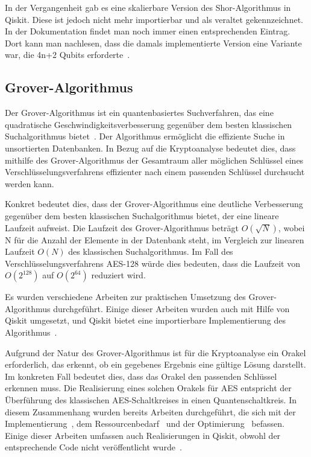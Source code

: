 \documentclass[
  a4paper, %
  10pt, %
  unnumberedsections, %
  twoside, %
]{LTJournalArticle}
\begin{document}
In der Vergangenheit gab es eine skalierbare Version des Shor-Algorithmus in Qiskit.
Diese ist jedoch nicht mehr importierbar und als veraltet gekennzeichnet.
In der Dokumentation findet man noch immer einen entsprechenden Eintrag.
Dort kann man nachlesen, dass die damals implementierte Version eine Variante war,
die 4n+2 Qubits erforderte~\autocite{IBM:Shor_docu}.

\subsection{Grover-Algorithmus}
Der Grover-Algorithmus ist ein quantenbasiertes Suchverfahren,
das eine quadratische Geschwindigkeitsverbesserung
gegenüber dem besten klassischen Suchalgorithmus bietet~\autocite{grover1996fast}.
Der Algorithmus ermöglicht die effiziente Suche in unsortierten Datenbanken.
In Bezug auf die Kryptoanalyse bedeutet dies,
dass mithilfe des Grover-Algorithmus der Gesamtraum aller möglichen Schlüssel
eines Verschlüsselungsverfahrens effizienter nach einem passenden Schlüssel durchsucht werden kann.

Konkret bedeutet dies,
dass der Grover-Algorithmus eine deutliche Verbesserung gegenüber dem besten klassischen Suchalgorithmus bietet,
der eine lineare Laufzeit aufweist.
Die Laufzeit des Grover-Algorithmus beträgt $O(\sqrt N)$,
wobei N für die Anzahl der Elemente in der Datenbank steht,
im Vergleich zur linearen Laufzeit $O(N)$ des klassischen Suchalgorithmus.
Im Fall des Verschlüsselungsverfahrens AES-128 würde dies bedeuten,
dass die Laufzeit von $O(2^{128})$ auf $O(2^{64})$ reduziert wird.

Es wurden verschiedene Arbeiten zur praktischen Umsetzung des Grover-Algorithmus durchgeführt.
Einige dieser Arbeiten wurden auch mit Hilfe von Qiskit umgesetzt,
und Qiskit bietet eine importierbare Implementierung des Algorithmus~\autocite{IBM:Grover}.

Aufgrund der Natur des Grover-Algorithmus ist für die Kryptoanalyse ein Orakel erforderlich,
das erkennt, ob ein gegebenes Ergebnis eine gültige Lösung darstellt.
Im konkreten Fall bedeutet dies, dass das Orakel den passenden Schlüssel erkennen muss.
Die Realisierung eines solchen Orakels für AES
entspricht der Überführung des klassischen AES-Schaltkreises in einen Quantenschaltkreis.
In diesem Zusammenhang wurden bereits Arbeiten durchgeführt,
die sich mit der Implementierung~\autocite{jaques2019implementing},
dem Ressourcenbedarf~\autocite{grassl2015applying} und der Optimierung~\autocite{Li2022} befassen.
Einige dieser Arbeiten umfassen auch Realisierungen in Qiskit,
obwohl der entsprechende Code nicht veröffentlicht wurde~\autocite{app11199085}.
\end{document}
